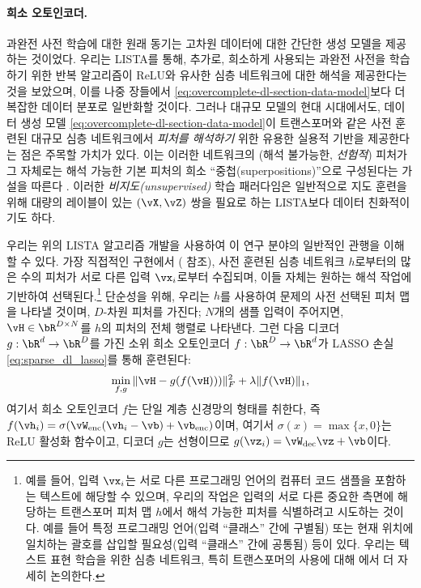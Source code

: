 \documentclass[../../book-main_ko.tex]{subfiles}
\begin{document}
\paragraph{희소 오토인코더.}
과완전 사전 학습에 대한 원래 동기는 고차원 데이터에 대한 간단한 생성 모델을 제공하는 것이었다. 우리는 LISTA를 통해, 추가로, 희소하게 사용되는 과완전 사전을 학습하기 위한 반복 알고리즘이 ReLU와 유사한 심층 네트워크에 대한 해석을 제공한다는 것을 보았으며, 이를 나중 장들에서 \eqref{eq:overcomplete-dl-section-data-model}보다 더 복잡한 데이터 분포로 일반화할 것이다. 그러나 대규모 모델의 현대 시대에서도, 데이터 생성 모델 \eqref{eq:overcomplete-dl-section-data-model}이 트랜스포머와 같은 사전 훈련된 대규모 심층 네트워크에서 \textit{피처를 해석하기} 위한 유용한 실용적 기반을 제공한다는 점은 주목할 가치가 있다. 이는 이러한 네트워크의 (해석 불가능한, \textit{선험적}) 피처가 그 자체로는 해석 가능한 기본 피처의 희소 ``중첩(superpositions)''으로 구성된다는 가설을 따른다 \cite{elhage2022superposition}. 이러한 \textit{비지도(unsupervised)} 학습 패러다임은 일반적으로 지도 훈련을 위해 대량의 레이블이 있는 $(\vX, \vZ)$ 쌍을 필요로 하는 LISTA보다 데이터 친화적이기도 하다.

우리는 위의 LISTA 알고리즘 개발을 사용하여 이 연구 분야의 일반적인 관행을 이해할 수 있다. 가장 직접적인 구현에서 (\citep{huben2024sparse, gao2025scaling} 참조), 사전 훈련된 심층 네트워크 $h$로부터의 많은 수의 피처가 서로 다른 입력 $\vx_i$로부터 수집되며, 이들 자체는 원하는 해석 작업에 기반하여 선택된다.\footnote{예를 들어, 입력 $\vx_i$는 서로 다른 프로그래밍 언어의 컴퓨터 코드 샘플을 포함하는 텍스트에 해당할 수 있으며, 우리의 작업은 입력의 서로 다른 중요한 측면에 해당하는 트랜스포머 피처 맵 $h$에서 해석 가능한 피처를 식별하려고 시도하는 것이다. 예를 들어 특정 프로그래밍 언어(입력 ``클래스'' 간에 구별됨) 또는 현재 위치에 일치하는 괄호를 삽입할 필요성(입력 ``클래스'' 간에 공통됨) 등이 있다. 우리는 텍스트 표현 학습을 위한 심층 네트워크, 특히 트랜스포머의 사용에 대해 에서 더 자세히 논의한다.} 단순성을 위해, 우리는 $h$를 사용하여 문제의 사전 선택된 피처 맵을 나타낼 것이며, $D$-차원 피처를 가진다; $N$개의 샘플 입력이 주어지면, $\vH \in \bR^{D \times N}$를 $h$의 피처의 전체 행렬로 나타낸다. 그런 다음 디코더 $g : \bR^d \to \bR^D$를 가진 소위 희소 오토인코더 $f : \bR^D \to \bR^d$가 LASSO 손실 \eqref{eq:sparse_dl_lasso}를 통해 훈련된다:
\begin{equation}\label{eq:sae-loss}
  \min_{f, g} \| \vH - g(f(\vH))) \|_F^2 + \lambda \|f(\vH)\|_1 ,
\end{equation}
여기서 희소 오토인코더 $f$는 단일 계층 신경망의 형태를 취한다, 즉 $f(\vh_i) = \sigma(\vW_{\mathrm{enc}}(\vh_i - \vb) + \vb_{\mathrm{enc}})$이며, 여기서 $\sigma(x) = \max \{x, 0\}$는 ReLU 활성화 함수이고, 디코더 $g$는 선형이므로 $g(\vz_i) = \vW_{\mathrm{dec}}\vz + \vb$이다.
\end{document}
